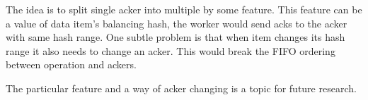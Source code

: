 The idea is to split single acker into multiple by some feature. This feature can be a value of data item's balancing hash, the worker would send acks to the acker with same hash range. One subtle problem is that when item changes its hash range it also needs to change an acker. This would break the FIFO ordering between operation and ackers. 

The particular feature and a way of acker changing is a topic for future research.

